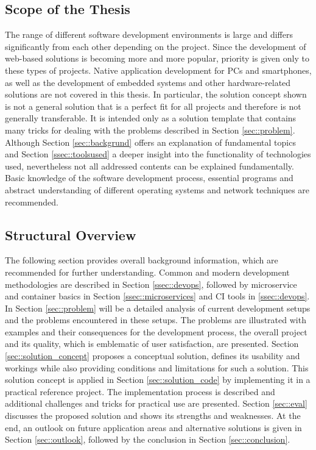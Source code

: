 \documentclass[12pt, a4paper]{article}
\begin{document}
    \subsection{Scope of the Thesis}
    The range of different software development environments is large and differs significantly from each other depending on the project. Since the development of web-based solutions is becoming more and more popular, priority is given only to these types of projects. Native application development for PCs and smartphones, as well as the development of embedded systems and other hardware-related solutions are not covered in this thesis.\newline
    In particular, the solution concept shown is not a general solution that is a perfect fit for all projects and therefore is not generally transferable. It is intended only as a solution template that contains many tricks for dealing with the problems described in Section \ref{sec::problem}. Although Section \ref{sec::backgrund} offers an explanation of fundamental topics and Section \ref{ssec::toolsused} a deeper insight into the functionality of technologies used, nevertheless not all addressed contents can be explained fundamentally. Basic knowledge of the software development process, essential programs and abstract understanding of different operating systems and network techniques are recommended.

    \subsection{Structural Overview}
    The following section provides overall background information, which are recommended for further understanding. Common and modern development methodologies are described in Section \ref{ssec::devops}, followed by microservice and container basics in Section \ref{ssec::microservices} and \acl{CI} tools in \ref{ssec::devops}. In Section \ref{sec::problem} will be a detailed analysis of current development setups and the problems encountered in these setups. The problems are illustrated with examples and their consequences for the development process, the overall project and its quality, which is emblematic of user satisfaction, are presented. Section \ref{sec::solution_concept} proposes a conceptual solution, defines its usability and workings while also providing conditions and limitations for such a solution. This solution concept is applied in Section \ref{sec::solution_code} by implementing it in a practical reference project. The implementation process is described and additional challenges and tricks for practical use are presented. Section \ref{sec::eval} discusses the proposed solution and shows its strengths and weaknesses. At the end, an outlook on future application areas and alternative solutions is given in Section \ref{sec::outlook}, followed by the conclusion in Section \ref{sec::conclusion}.
\end{document}
